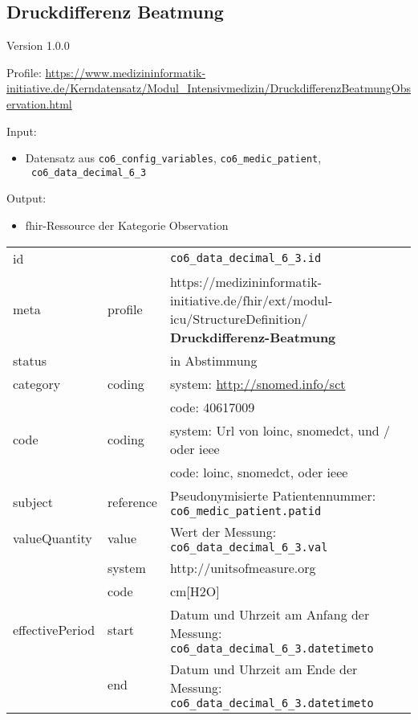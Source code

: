 \subsection{Druckdifferenz Beatmung} 
\noindent Version 1.0.0

\noindent Profile: \url{https://www.medizininformatik-initiative.de/Kerndatensatz/Modul_Intensivmedizin/DruckdifferenzBeatmungObservation.html}

\noindent Input:
\begin{itemize}
	\item Datensatz aus \texttt{co6\_config\_variables}, \texttt{co6\_medic\_patient}, \\ \texttt{
co6\_data\_decimal\_6\_3}
\end{itemize}
Output:
\begin{itemize}
        \item \ac{fhir}-Ressource der Kategorie \glqq Observation\grqq{}
\end{itemize}
\begin{longtable}{|l|l|p{7.5cm}|}
        \hline
        \rowcolor{lightgray} \multicolumn{3}{|l|}{Data Mapping (inhaltlich)} \\ \hline
        id &  & \texttt{co6\_data\_decimal\_6\_3.id} \\ \hline
	meta & profile & https://medizininformatik-initiative.de/fhir/ext/modul-icu/StructureDefinition/\textbf{
Druckdifferenz-Beatmung} \\ \hline 
	status &  & in Abstimmung  \\ \hline 
	category & coding & system: \url{http://snomed.info/sct} \\
\cline{3-3}
	& & code: 40617009 \\ \hline
	code & coding & system: Url von \ac{loinc}, \ac{snomedct}, und / oder \ac{ieee} \\ 
	\cline{3-3} 
	 &  & code: \ac{loinc}, \ac{snomedct}, oder \ac{ieee} \\ \hline
	subject & reference & Pseudonymisierte Patientennummer: \texttt{co6\_medic\_patient.patid} \\ \hline
	valueQuantity & value & Wert der Messung: \texttt{
co6\_data\_decimal\_6\_3.val} \\
        \cline{2-3}
         & system & http://unitsofmeasure.org \\
         \cline{2-3}
         & code &
cm[H2O]
\\ \hline
    effectivePeriod & start & Datum und Uhrzeit am Anfang der Messung: \texttt{
co6\_data\_decimal\_6\_3.datetimeto} \\
    \cline{2-3}
     & end & Datum und Uhrzeit am Ende der Messung: \texttt{
co6\_data\_decimal\_6\_3.datetimeto} \\ \hline
\end{longtable}


